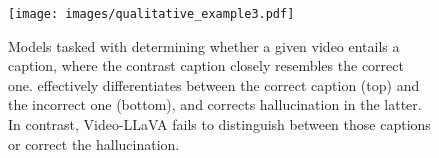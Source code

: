 \begin{figure}[t]
    \centering
    \texttt{[image: images/qualitative\_example3.pdf]} 
    \vspace{-0.5cm}
    \caption{
    Models tasked with determining whether a given video entails a caption, where the contrast caption closely resembles the correct one. 
    \method{} effectively differentiates between the correct caption (top) and the incorrect one (bottom), and corrects hallucination in the latter.
    In contrast, Video-LLaVA fails to distinguish between those captions or correct the hallucination.}
    \label{fig:haca}
    \vspace{-0.3cm}
\end{figure}
